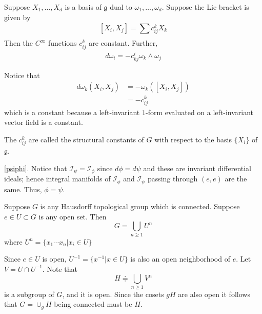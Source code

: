 \documentclass[11pt,a4paper]{scrarticle}
\theoremstyle{definition}
\renewenvironment{proof}[1][\proofname]{\vspace{-10pt}\begin{myproof}}{\end{myproof}}
\theoremstyle{greenbox}
\newcommand{\define}{\doteqdot}
\begin{document}
    \begin{lemma}
        Suppose $ X_{1}, \ldots, X_{d} $ is a basis of $ \mathfrak{g} $ dual to $ \omega_{1}, \ldots, \omega_{d} $. Suppose the Lie bracket is given by 
        \[ [X_{i},X_{j}]  = \sum_{}^{} c_{ij}^{k}X_{k} \]
        Then the $ C^{\infty} $ functions $ c_{ij}^{k} $ are constant. Further, \begin{align*}
            d \omega_{i} = -c_{kj}^{i} \omega_{k} \wedge \omega_{j}
        \end{align*}
    \end{lemma}
    \begin{proof}
        Notice that \begin{align*}
            d \omega_{k}(X_{i},X_{j}) & = - \omega_{k}([X_{i},X_{j}]) \\
            & = - c_{ij}^{k} 
        \end{align*}
        which is a constant because a left-invariant $ 1 $-form evaluated on a left-invariant vector field is a constant.  
    \end{proof}
    \begin{remark}
        The $ c_{ij}^{k} $ are called the structural constants of $ G $ with respect to the basis $ \{X_{i}\} $ of $ \mathfrak{g} $.
    \end{remark}
    \vspace{1cm}
    \begin{proof}
        \cref{psiphi}. Notice that $ \mathcal{I}_{\psi} = \mathcal{I}_{\phi} $ since $ d \phi = d \psi $ and these are invariant differential ideals; hence integral manifolds of $ \mathcal{I}_{\phi} $ and $ \mathcal{I}_{\psi} $ passing through $ (e,e) $ are the same. Thus, $ \phi = \psi $.
    \end{proof}

    \begin{lemma}
        Suppose $ G $ is any Hausdorff topological group which is connected. Suppose $ e \in U \subset G $ is any open set. Then 
        \[ G = \bigcup_{n \ge 1} U^{n}\]
        where $ U^{n} = \{x_{1} \cdots x_{n} |  x_{i} \in U\} $
    \end{lemma}
    \begin{proof}
        Since $ e \in U$ is open, $ U^{-1}  = \{x^{-1}| x \in U\}$ is also an open neighborhood of $ e $. Let $ V = U \cap U^{-1} $. Note that 
        \[ H \define \bigcup_{n \ge 1}V^{n} \]
        is a subgroup of $ G $, and it is open. Since the cosets $ gH $ are also open it follows that $ G =  \cup_{g}H $ being connected must be $ H $.
        
    \end{proof}
\end{document}
